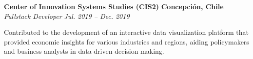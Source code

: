 \item
\headerrow
{\textbf{Center of Innovation Systems Studies (CIS2)}}
{\textbf{Concepción, Chile}}
\headerrow
{\emph{Fullstack Developer}}
{\emph{Jul. 2019 -- Dec. 2019}}
\begin{itemize*}
    \item Contributed to the development of an interactive data visualization platform
    that provided economic insights for various industries and regions, aiding
    policymakers and business analysts in data-driven decision-making.
\end{itemize*}